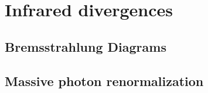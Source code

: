\chapter{Infrared divergences}

\section{Bremsstrahlung Diagrams}

\section{Massive photon renormalization}